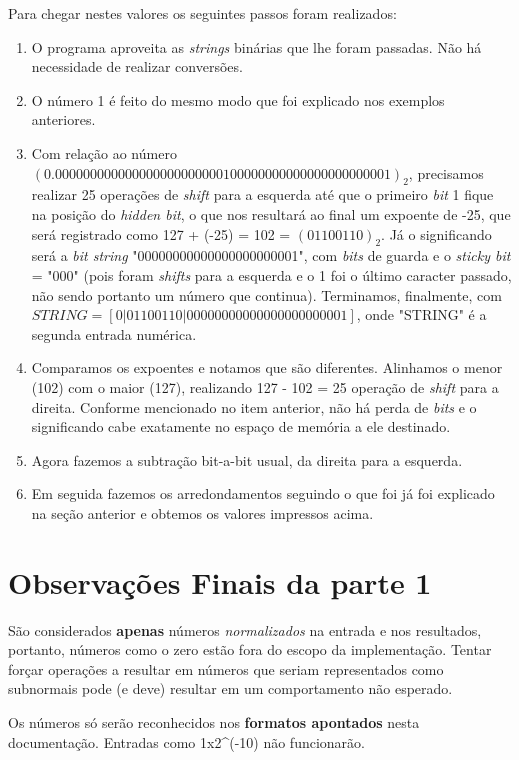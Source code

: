 \documentclass[11pt]{article}
\begin{document}
Para chegar nestes valores os seguintes passos foram realizados:
\begin{enumerate}
  \item O programa aproveita as \textit{strings} binárias que lhe foram passadas. Não há necessidade de realizar conversões.
  \item O número 1 é feito do mesmo modo que foi explicado nos exemplos anteriores.
  \item Com relação ao número $(0.000000000000000000000000100000000000000000000001)_2$, precisamos realizar 25 operações de \textit{shift} para a esquerda até que o primeiro \textit{bit} 1 fique na posição
  do \textit{hidden bit}, o que nos resultará ao final um expoente de -25, que será registrado como 127 + (-25) = 102 = $(01100110)_2$. Já o significando será a \textit{bit string} "00000000000000000000001", com
  \textit{bits} de guarda e o \textit{sticky bit} = "000" (pois foram \textit{shifts} para a esquerda e o 1 foi o último caracter passado, não sendo portanto um número que continua). Terminamos, finalmente, com
  {\small$STRING = [ 0 | 0 1 1 0 0 1 1 0 | 0 0 0 0 0 0 0 0 0 0 0 0 0 0 0 0 0 0 0 0 0 0 1 ] $}, onde "STRING" é a segunda entrada numérica.
  \item Comparamos os expoentes e notamos que são diferentes. Alinhamos o menor (102) com o maior (127), realizando 127 - 102 = 25 operação de \textit{shift} para a direita. Conforme mencionado no item anterior,
  não há perda de \textit{bits} e o significando cabe exatamente no espaço de memória a ele destinado.
  \item Agora fazemos a subtração bit-a-bit usual, da direita para a esquerda.
  \item Em seguida fazemos os arredondamentos seguindo o que foi já foi explicado na seção anterior e obtemos os valores impressos acima.
\end{enumerate}

\section{Observações Finais da parte 1}

\indent\indent São considerados \textbf{apenas} números \textit{normalizados} na entrada e nos resultados, portanto, números como o zero estão fora do escopo da implementação. Tentar forçar
operações a resultar em números que seriam representados como subnormais pode (e deve) resultar em um comportamento não esperado.

Os números só serão reconhecidos nos \textbf{formatos apontados} nesta documentação. Entradas como 1x2\textasciicircum(-10) não funcionarão.

\indent\indent
\end{document}
